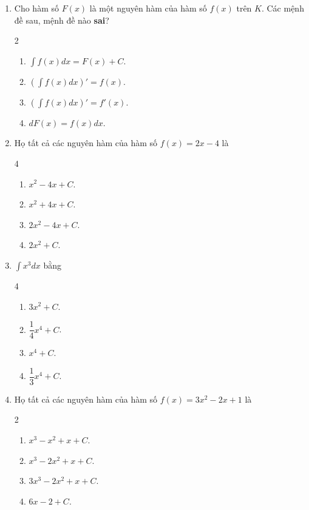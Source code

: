 \documentclass[12pt]{article}
\begin{document}
	\begin{enumerate}[label=\textbf{Câu \arabic*.}]
		
		\item Cho hàm số $F(x)$ là một nguyên hàm của hàm số $f(x)$ trên $K$. Các mệnh đề sau, mệnh đề nào \textbf{sai}?
		\begin{multicols}{2}
			\begin{enumerate}[label=\textbf{\Alph*.}]
				\item $\displaystyle \int f(x)dx = F(x) + C$.
				\item $\displaystyle \left( \int f(x)dx \right)' = f(x)$.
				\item $\displaystyle \left( \int f(x)dx \right)' = f'(x)$.
				\item $dF(x) = f(x)dx$.
			\end{enumerate}
		\end{multicols}
		
		\item Họ tất cả các nguyên hàm của hàm số $f(x) = 2x - 4$ là
		\begin{multicols}{4}
			\begin{enumerate}[label=\textbf{\Alph*.}]
				\item $x^2 - 4x + C$.
				\item $x^2 + 4x + C$.
				\item $2x^2 - 4x + C$.
				\item $2x^2 + C$.
			\end{enumerate}
		\end{multicols}
		
		\item $\displaystyle \int x^3 dx$ bằng
		\begin{multicols}{4}
			\begin{enumerate}[label=\textbf{\Alph*.}]
				\item $3x^2 + C$.
				\item $\dfrac{1}{4}x^4 + C$.
				\item $x^4 + C$.
				\item $\dfrac{1}{3}x^4 + C$.
			\end{enumerate}
		\end{multicols}
		
		\item Họ tất cả các nguyên hàm của hàm số $f(x) = 3x^2 - 2x + 1$ là
		\begin{multicols}{2}
			\begin{enumerate}[label=\textbf{\Alph*.}]
				\item $x^3 - x^2 + x + C$.
				\item $x^3 - 2x^2 + x + C$.
				\item $3x^3 - 2x^2 + x + C$.
				\item $6x - 2 + C$.
			\end{enumerate}
		\end{multicols}
		

\end{enumerate}
\end{document}
